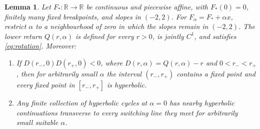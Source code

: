 \documentclass[11pt]{article}
\newtheorem{lemma}[theorem]{Lemma}
\theoremstyle{remark}
\newcommand{\R}{\mathbb R}
\begin{document}
\begin{lemma}\label{lem:regularization}
Let \(F_*:\R\to\R\) be continuous and piecewise affine, with
\(F_*(0)=0\), finitely many fixed breakpoints, and slopes in \((-2,2)\).
For \(F_\alpha=F_*+\alpha x\), restrict \(\alpha\) to a neighbourhood
of zero in which the slopes remain in \((-2,2)\).  The lower return
\(Q(r,\alpha)\) is defined for every \(r>0\), is jointly \(C^1\), and
satisfies \eqref{eq:rotation}.  Moreover:
\begin{enumerate}
\item If \(D(r_-,0)D(r_+,0)<0\), where
\(D(r,\alpha)=Q(r,\alpha)-r\) and \(0<r_-<r_+\), then for arbitrarily
small \(\alpha\) the interval \((r_-,r_+)\) contains a fixed point and
every fixed point in \([r_-,r_+]\) is hyperbolic.
\item Any finite collection of hyperbolic cycles at \(\alpha=0\) has
nearby hyperbolic continuations transverse to every switching line they
meet for arbitrarily small suitable \(\alpha\).
\end{enumerate}
\end{lemma}
\end{document}
